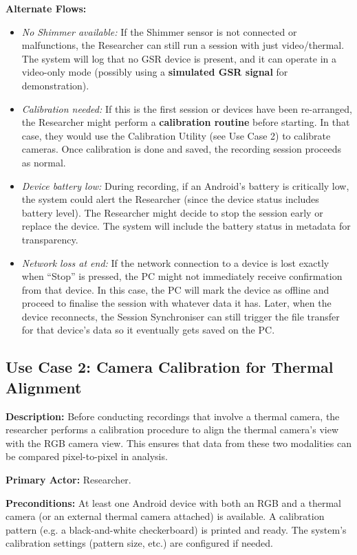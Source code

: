 \textbf{Alternate Flows:}
\begin{itemize}
    \item \emph{No Shimmer available:} If the Shimmer sensor is not connected or malfunctions, the Researcher can still run a session with just video/thermal. The system will log that no GSR device is present, and it can operate in a video-only mode (possibly using a \textbf{simulated GSR signal} for demonstration).
    \item \emph{Calibration needed:} If this is the first session or devices have been re-arranged, the Researcher might perform a \textbf{calibration routine} before starting. In that case, they would use the Calibration Utility (see Use Case 2) to calibrate cameras. Once calibration is done and saved, the recording session proceeds as normal.
    \item \emph{Device battery low:} During recording, if an Android's battery is critically low, the system could alert the Researcher (since the device status includes battery level). The Researcher might decide to stop the session early or replace the device. The system will include the battery status in metadata for transparency.
    \item \emph{Network loss at end:} If the network connection to a device is lost exactly when ``Stop'' is pressed, the PC might not immediately receive confirmation from that device. In this case, the PC will mark the device as offline and proceed to finalise the session with whatever data it has. Later, when the device reconnects, the Session Synchroniser can still trigger the file transfer for that device's data so it eventually gets saved on the PC.
\end{itemize}

\subsection{Use Case 2: Camera Calibration for Thermal Alignment}
\textbf{Description:} Before conducting recordings that involve a thermal camera, the researcher performs a calibration procedure to align the thermal camera's view with the RGB camera view. This ensures that data from these two modalities can be compared pixel-to-pixel in analysis.

\textbf{Primary Actor:} Researcher.

\textbf{Preconditions:} At least one Android device with both an RGB and a thermal camera (or an external thermal camera attached) is available. A calibration pattern (e.g. a black-and-white checkerboard) is printed and ready. The system's calibration settings (pattern size, etc.) are configured if needed.


